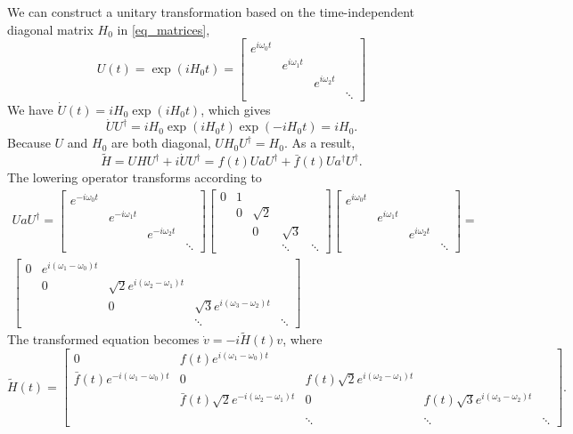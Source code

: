 \documentclass[11pt]{article}
\begin{document}
We can construct a unitary transformation based
on the time-independent diagonal matrix $H_0$ in \eqref{eq_matrices},
\[
U(t) = \exp(i H_0 t)=
\begin{bmatrix}
e^{i\omega_0t} & & &\\
& e^{i\omega_1 t} &&\\
& & e^{i\omega_2 t} &\\
& & & \ddots
\end{bmatrix}
\]
We have $\dot{U}(t) = i H_0 \exp(i H_0 t)$, which gives
\[
\dot{U}U^\dag =  i H_0 \exp(i H_0 t) \exp(- i H_0 t) = i H_0.
\]
Because $U$ and $H_0$ are both diagonal, $UH_0U^\dag = H_0$. As a result,
\[
\tilde{H} = U H U^\dag + i \dot{U}U^\dag = f(t) UaU^\dag + \bar{f}(t) Ua^\dag U^\dag.
\]
The lowering operator transforms according to
\begin{multline*}
UaU^\dag =
\begin{bmatrix}
  e^{-i\omega_0t} & & & \\
  & e^{-i\omega_1 t} & & \\
  & &  e^{-i\omega_2 t} & \\
  & & & \ddots
\end{bmatrix}
\begin{bmatrix}
0 & 1 & & &\\
 & 0 & \sqrt{2} & &\\
&  & 0 & \sqrt{3} &\\
& &  & \ddots & \ddots
\end{bmatrix}
\begin{bmatrix}
  e^{i\omega_0t} & & & \\
  & e^{i\omega_1 t} & & \\
  & &  e^{i\omega_2 t} & \\
  & & & \ddots
\end{bmatrix} = \\
%
\begin{bmatrix}
0 & e^{i(\omega_1 - \omega_0)t} & & &\\
 & 0 & \sqrt{2} e^{i(\omega_2 -\omega_1) t}& &\\
&  & 0 & \sqrt{3} e^{i(\omega_3 -\omega_2)t}  &\\
& &  & \ddots & \ddots
\end{bmatrix}
%
\end{multline*}
The transformed equation becomes $\dot{v} = -i\tilde{H}(t)v$, where
\[
\tilde{H}(t) = \begin{bmatrix}
0 & f(t) e^{i(\omega_1 - \omega_0)t} & & &\\
\bar{f}(t) e^{-i(\omega_1 - \omega_0)t} & 0 & f(t) \sqrt{2} e^{i(\omega_2 -\omega_1) t}& &\\
& \bar{f}(t) \sqrt{2} e^{-i(\omega_2 -\omega_1) t} & 0 & f(t) \sqrt{3} e^{i(\omega_3 -\omega_2)t}
&\\
\\
& & \ddots & \ddots & \ddots
\end{bmatrix}.
\]
\end{document}
